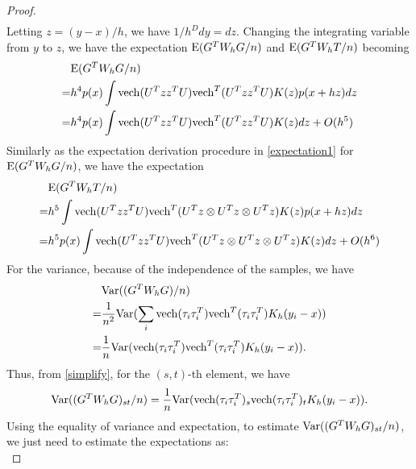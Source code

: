 \documentclass[aos,preprint]{imsart}
\theoremstyle{remark}
\begin{document}
\begin{appendix}
\begin{proof}
\[\begin{aligned}
\end{aligned}
\]
Letting $z = {(y-x)}/{h}$, we have ${1}/{h^D}dy = dz$. Changing the integrating variable from $y$ to $z$, we have the expectation ${\rm E} (G^TW_hG/n)$ and ${\rm E} (G^TW_hT/n)$ becoming
\begin{equation}\label{expectation1}
\begin{aligned}
&{\rm E} (G^TW_hG/n) \\
= & h^{4} p(x) \int {\rm vech}(U^T zz^TU)  {\rm vech}^T(U^T zz^TU) K(z) p(x+hz)d z\\
= &h^{4} p(x) \int {\rm vech}(U^T zz^TU)  {\rm vech}^T(U^T zz^TU) K(z)d z + O(h^5)
\end{aligned}
\end{equation}
Similarly as the expectation derivation procedure in \eqref{expectation1}  for ${\rm E} (G^TW_hG/n)$, we have the expectation
\begin{equation}\label{expectation2}
\begin{aligned}
&{\rm E} (G^TW_hT/n) \\
= &h^{5} \int {\rm vech}(U^Tz z^TU)  {\rm vech}^T(U^Tz\otimes U^Tz\otimes U^Tz) K(z) p(x+hz)d z\\
= & h^{5} p(x) \int {\rm vech}(U^Tz z^TU)  {\rm vech}^T(U^Tz\otimes U^Tz\otimes U^Tz) K(z) d z+ O(h^6)
\end{aligned}
\end{equation}
For the variance, because of the independence of the samples, we have
\begin{equation}
\begin{aligned}\label{simplify}
&{\rm Var}((G^TW_hG)/n) \\
=&\frac{1}{n^2} {\rm Var}(\sum_i {\rm vech}(\tau_i\tau_i^T)  {\rm vech}^T(\tau_i\tau_i^T) K_h(y_i-x))\\
=&\frac{1}{n} {\rm Var} ({\rm vech}(\tau_i\tau_i^T)  {\rm vech}^T(\tau_i\tau_i^T) K_h(y_i-x)).\\
\end{aligned}
\end{equation}
Thus, from \eqref{simplify}, for the $(s,t)$-th element, we have
\[
{\rm Var}((G^TW_hG)_{st}/n)=\frac{1}{n}{\rm Var}({\rm vech}(\tau_i\tau_i^T)_s  {\rm vech}(\tau_i\tau_i^T)_tK_h(y_i-x)).
\]
Using the equality of variance and expectation, to estimate ${\rm Var}((G^TW_hG)_{st}/n)$, we just need to estimate the expectations as:
\begin{equation}\label{sim2}

\end{equation}
\end{proof}
\end{appendix}
\end{document}
